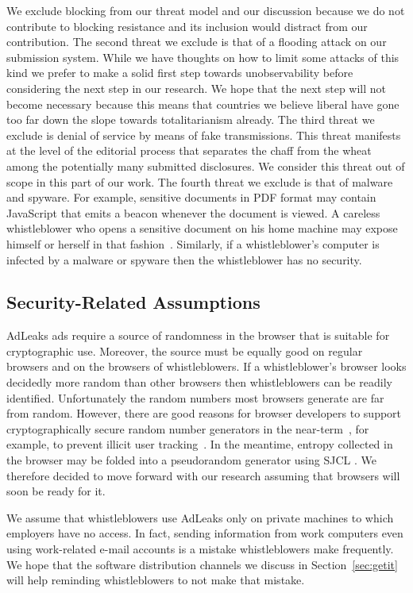 \documentclass[twocolumn,10pt]{article}
\begin{document}
We exclude blocking from our threat model and our discussion because we do
not contribute to blocking resistance and its inclusion would distract from
our contribution.
The second threat we exclude is that of a flooding attack on our submission
system.  While we have thoughts on how to limit some attacks of this kind we
prefer to make a solid first step towards unobservability before considering
the next step in our research.  We hope that the next step will not become
necessary because this means that countries we believe liberal have gone too
far down the slope towards totalitarianism already.
The third threat we exclude is denial of service by means of fake
transmissions.  This threat manifests at the level of the editorial process
that separates the chaff from the wheat among the potentially many submitted
disclosures.  We consider this threat out of scope in this part of our work.
The fourth threat we exclude is that of malware and spyware.  For example,
sensitive documents in PDF format may contain JavaScript that emits a beacon
whenever the document is viewed.  A careless whistleblower who opens a
sensitive document on his home machine may expose himself or herself in that
fashion~\cite{BowenHKS2009}.  Similarly, if a whistleblower's computer is
infected by a malware or spyware then the whistleblower has no security.


\subsection{Security-Related Assumptions}

AdLeaks ads require a source of randomness in the browser that is suitable
for cryptographic use.  Moreover, the source must be equally good on regular
browsers and on the browsers of whistleblowers.  If a whistleblower's
browser looks decidedly more random than other browsers then whistleblowers
can be readily identified.  Unfortunately the random numbers most browsers
generate are far from random.  However, there are good reasons for browser
developers to support cryptographically secure random number generators in
the near-term~\cite{webcryptoapi}, for example, to prevent illicit user
tracking~\cite{Klein2008}.  In the meantime, entropy collected in the
browser may be folded into a pseudorandom generator using SJCL
\cite{StarkHB09}.  We therefore decided to move forward with our research
assuming that browsers will soon be ready for it.

We assume that whistleblowers use AdLeaks only on private machines to which
employers have no access.  In fact, sending information from work computers
even using work-related e-mail accounts is a mistake whistleblowers make
frequently.  We hope that the software distribution channels we discuss in
Section~\ref{sec:getit} will help reminding whistleblowers to not make that
mistake.
\end{document}
